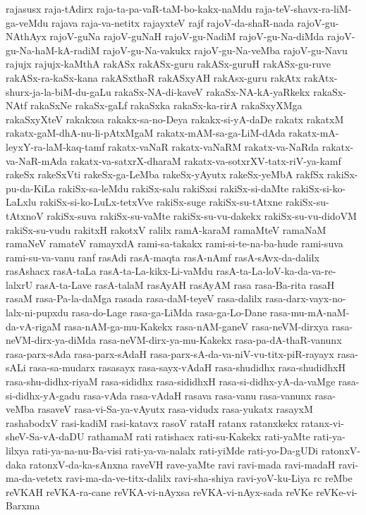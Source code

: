 {rajasusx
raja-tAdirx
raja-ta-pa-vaR-taM-bo-kakx-naMdu
raja-teV-shavx-ra-liM-ga-veMdu
rajava
raja-va-netitx
rajayxteV
rajf
rajoV-da-shaR-nada
rajoV-gu-NAthAyx
rajoV-guNa
rajoV-guNaH
rajoV-gu-NadiM
rajoV-gu-Na-diMda
rajoV-gu-Na-haM-kA-radiM
rajoV-gu-Na-vakukx
rajoV-gu-Na-veMba
rajoV-gu-Navu
rajujx
rajujx-kaMthA
rakASx
rakASx-guru
rakASx-guruH
rakASx-gu-ruve
rakASx-ra-kaSx-kana
rakASxthaR
rakASxyAH
rakAsx-guru
rakAtx
rakAtx-shurx-ja-la-biM-du-gaLu
rakaSx-NA-di-kaveV
rakaSx-NA-kA-yaRkekx
rakaSx-NAtf
rakaSxNe
rakaSx-gaLf
rakaSxka
rakaSx-ka-rirA
rakaSxyXMga
rakaSxyXteV
rakakxsa
rakakx-sa-no-Deya
rakakx-si-yA-daDe
rakatx
rakatxM
rakatx-gaM-dhA-nu-li-pAtxMgaM
rakatx-mAM-sa-ga-LiM-dAda
rakatx-mA-leyxY-ra-laM-kaq-tamf
rakatx-vaNaR
rakatx-vaNaRM
rakatx-va-NaRda
rakatx-va-NaR-mAda
rakatx-va-satxrX-dharaM
rakatx-va-sotxrXV-tatx-riV-ya-kamf
rakeSx
rakeSxVti
rakeSx-ga-LeMba
rakeSx-yAyutx
rakeSx-yeMbA
rakfSx
rakiSx-pu-da-KiLa
rakiSx-sa-leMdu
rakiSx-salu
rakiSxsi
rakiSx-si-daMte
rakiSx-si-ko-LaLxlu
rakiSx-si-ko-LuLx-tetxVve
rakiSx-suge
rakiSx-su-tAtxne
rakiSx-su-tAtxnoV
rakiSx-suva
rakiSx-su-vaMte
rakiSx-su-vu-dakekx
rakiSx-su-vu-didoVM
rakiSx-su-vudu
rakitxH
rakotxV
ralilx
ramA-karaM
ramaMteV
ramaNaM
ramaNeV
ramateV
ramayxdA
rami-sa-takakx
rami-si-te-na-ba-hude
rami-suva
rami-su-va-vanu
ranf
rasAdi
rasA-maqta
rasA-nAmf
rasA-sAvx-da-dalilx
rasAshacx
rasA-taLa
rasA-ta-La-kikx-Li-vaMdu
rasA-ta-La-loV-ka-da-va-re-lalxrU
rasA-ta-Lave
rasA-talaM
rasAyAH
rasAyAM
rasa
rasa-Ba-rita
rasaH
rasaM
rasa-Pa-la-daMga
rasada
rasa-daM-teyeV
rasa-dalilx
rasa-darx-vayx-no-lalx-ni-pupxdu
rasa-do-Lage
rasa-ga-LiMda
rasa-ga-Lo-Dane
rasa-mu-mA-naM-da-vA-rigaM
rasa-nAM-ga-mu-Kakekx
rasa-nAM-ganeV
rasa-neVM-dirxya
rasa-neVM-dirx-ya-diMda
rasa-neVM-dirx-ya-mu-Kakekx
rasa-pa-dA-thaR-vanunx
rasa-parx-sAda
rasa-parx-sAdaH
rasa-parx-sA-da-va-niV-vu-titx-piR-rayayx
rasa-sALi
rasa-sa-mudarx
rasasayx
rasa-sayx-vAdaH
rasa-shudidhx
rasa-shudidhxH
rasa-shu-didhx-riyaM
rasa-sididhx
rasa-sididhxH
rasa-si-didhx-yA-da-vaMge
rasa-si-didhx-yA-gadu
rasa-vAda
rasa-vAdaH
rasava
rasa-vanu
rasa-vanunx
rasa-veMba
rasaveV
rasa-vi-Sa-ya-vAyutx
rasa-vidudx
rasa-yukatx
rasayxM
rashabodxV
rasi-kadiM
rasi-katavx
rasoV
rataH
ratanx
ratanxkekx
ratanx-vi-sheV-Sa-vA-daDU
rathamaM
rati
ratishacx
rati-su-Kakekx
rati-yaMte
rati-ya-lilxya
rati-ya-na-nu-Ba-visi
rati-ya-va-nalalx
rati-yiMde
rati-yo-Da-gUDi
ratonxV-daka
ratonxV-da-ka-sAnxna
raveVH
rave-yaMte
ravi
ravi-mada
ravi-madaH
ravi-ma-da-vetetx
ravi-ma-da-ve-titx-dalilx
ravi-sha-shiya
ravi-yoV-ku-Liya
rc
reMbe
reVKAH
reVKA-ra-cane
reVKA-vi-nAyxsa
reVKA-vi-nAyx-sada
reVKe
reVKe-vi-Barxma
}
